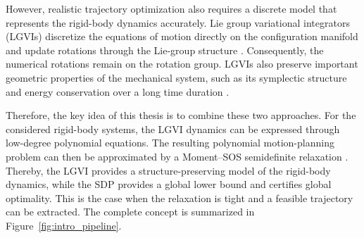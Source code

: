 However, realistic trajectory optimization also requires a discrete model that represents
the rigid-body dynamics accurately. Lie group variational integrators (LGVIs) discretize the 
equations of motion directly on the configuration manifold and update rotations through the 
Lie-group structure \cite{Marsden2001,Lee2008}. Consequently, the numerical rotations remain 
on the rotation group. LGVIs also preserve important 
geometric properties of the mechanical system, such as its symplectic structure and 
energy conservation over a long time duration \cite{Sangli2025}. 

Therefore, the key idea of this thesis is to combine these two approaches. For the considered 
rigid-body systems, the LGVI dynamics can be expressed through low-degree polynomial equations. 
The resulting polynomial motion-planning problem can then be approximated by a Moment--SOS 
semidefinite relaxation \cite{Sangli2025}. Thereby, the LGVI provides a structure-preserving 
model of the rigid-body dynamics, while the SDP provides a global lower bound and 
certifies global optimality.
This is the case when the relaxation is tight and a feasible trajectory can be extracted. 
The complete 
concept is summarized in Figure~\ref{fig:intro_pipeline}.

